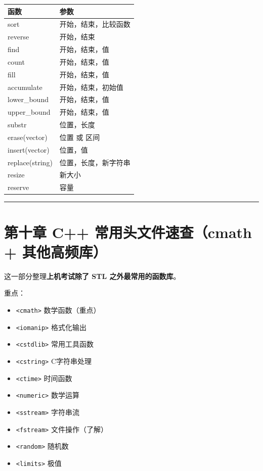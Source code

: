 \documentclass[10pt,twocolumn]{extarticle}
\begin{document}
\begin{table}[h]
\centering
\begin{tabular}{|l|l|}
\hline
函数 & 参数 \\ \hline
sort & 开始，结束，比较函数 \\ \hline
reverse & 开始，结束 \\ \hline
find & 开始，结束，值 \\ \hline
count & 开始，结束，值 \\ \hline
fill & 开始，结束，值 \\ \hline
accumulate & 开始，结束，初始值 \\ \hline
lower\_bound & 开始，结束，值 \\ \hline
upper\_bound & 开始，结束，值 \\ \hline
substr & 位置，长度 \\ \hline
erase(vector) & 位置 或 区间 \\ \hline
insert(vector) & 位置，值 \\ \hline
replace(string) & 位置，长度，新字符串 \\ \hline
resize & 新大小 \\ \hline
reserve & 容量 \\ \hline
\end{tabular}
\end{table}

\noindent\rule{\linewidth}{0.4pt}

\section{第十章 C++ 常用头文件速查（cmath + 其他高频库）}

这一部分整理\textbf{上机考试除了 STL 之外最常用的函数库}。

重点：
\begin{itemize}
    \item \texttt{<cmath>} 数学函数（重点）
    \item \texttt{<iomanip>} 格式化输出
    \item \texttt{<cstdlib>} 常用工具函数
    \item \texttt{<cstring>} C字符串处理
    \item \texttt{<ctime>} 时间函数
    \item \texttt{<numeric>} 数学运算
    \item \texttt{<sstream>} 字符串流
    \item \texttt{<fstream>} 文件操作（了解）
    \item \texttt{<random>} 随机数
    \item \texttt{<limits>} 极值
\end{itemize}
\end{document}
